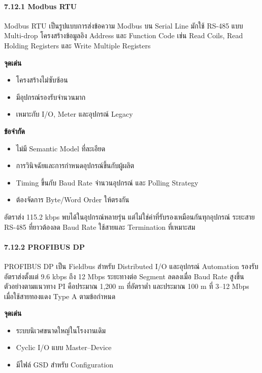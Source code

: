 \paragraph{7.12.1 Modbus RTU}

Modbus RTU เป็นรูปแบบการส่งข้อความ Modbus บน Serial Line มักใช้ RS-485 แบบ Multi-drop โครงสร้างข้อมูลอิง Address และ Function Code เช่น Read Coils, Read Holding Registers และ Write Multiple Registers

\textbf{จุดเด่น}

\begin{itemize}
    \item โครงสร้างไม่ซับซ้อน
    \item มีอุปกรณ์รองรับจำนวนมาก
    \item เหมาะกับ I/O, Meter และอุปกรณ์ Legacy
\end{itemize}

\textbf{ข้อจำกัด}

\begin{itemize}
    \item ไม่มี Semantic Model ที่ละเอียด
    \item การวินิจฉัยและการกำหนดอุปกรณ์ขึ้นกับผู้ผลิต
    \item Timing ขึ้นกับ Baud Rate จำนวนอุปกรณ์ และ Polling Strategy
    \item ต้องจัดการ Byte/Word Order ให้ตรงกัน
\end{itemize}

อัตราส่ง 115.2 kbps พบได้ในอุปกรณ์หลายรุ่น แต่ไม่ใช่ค่าที่รับรองเหมือนกันทุกอุปกรณ์ ระยะสาย RS-485 ที่ยาวต้องลด Baud Rate ใช้สายและ Termination ที่เหมาะสม

\paragraph{7.12.2 PROFIBUS DP}

PROFIBUS DP เป็น Fieldbus สำหรับ Distributed I/O และอุปกรณ์ Automation รองรับอัตราส่งตั้งแต่ 9.6 kbps ถึง 12 Mbps ระยะทางต่อ Segment ลดลงเมื่อ Baud Rate สูงขึ้น ตัวอย่างตามแนวทาง PI คือประมาณ 1,200 m ที่อัตราต่ำ และประมาณ 100 m ที่ 3–12 Mbps เมื่อใช้สายทองแดง Type A ตามข้อกำหนด

\textbf{จุดเด่น}

\begin{itemize}
    \item ระบบนิเวศขนาดใหญ่ในโรงงานเดิม
    \item Cyclic I/O แบบ Master–Device
    \item มีไฟล์ GSD สำหรับ Configuration
\end{itemize}

